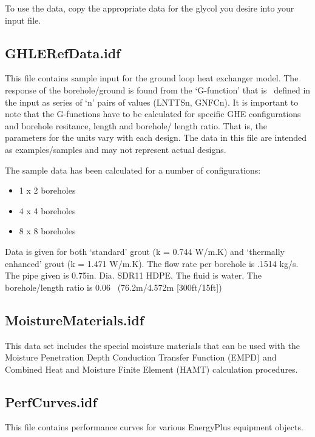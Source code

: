 To use the data, copy the appropriate data for the glycol you desire into your input file.

\subsection{GHLERefData.idf}\label{ghlerefdata.idf}

This file contains sample input for the ground loop heat exchanger model. The response of the borehole/ground is found from the `G-function' that is~ defined in the input as series of `n' pairs of values (LNTTSn, GNFCn). It is important to note that the G-functions have to be calculated for specific GHE configurations and borehole resitance, length and borehole/ length ratio. That is, the parameters for the units vary with each design. The data in this file are intended as examples/samples and may not represent actual designs.

The sample data has been calculated for a number of configurations:

\begin{itemize}
\tightlist
\item
  1 x 2 boreholes
\item
  4 x 4 boreholes
\item
  8 x 8 boreholes
\end{itemize}

Data is given for both `standard' grout (k = 0.744 W/m.K) and `thermally enhanced' grout (k = 1.471 W/m.K). The flow rate per borehole is .1514 kg/s. The pipe given is 0.75in. Dia. SDR11 HDPE. The fluid is water. The borehole/length ratio is 0.06~ (76.2m/4.572m {[}300ft/15ft{]})

\subsection{MoistureMaterials.idf}\label{moisturematerials.idf}

This data set includes the special moisture materials that can be used with the Moisture Penetration Depth Conduction Transfer Function (EMPD) and Combined Heat and Moisture Finite Element (HAMT) calculation procedures.

\subsection{PerfCurves.idf}\label{perfcurves.idf}

This file contains performance curves for various EnergyPlus equipment objects.

